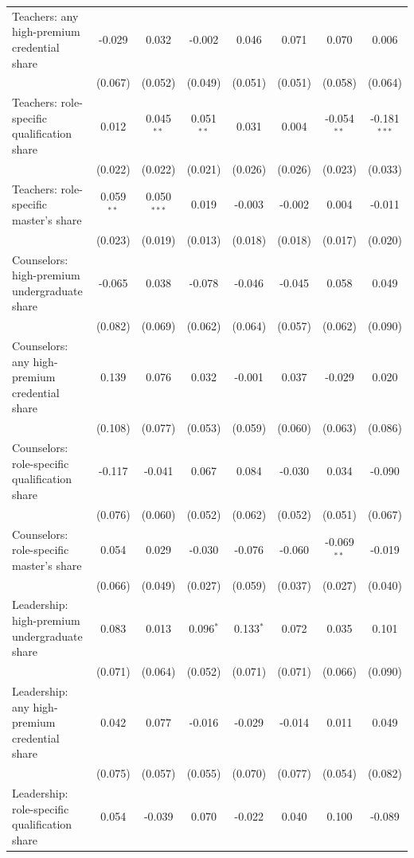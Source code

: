 \begin{table}[!htbp]
{\begin{tabular}{lccccccc}
\quad Teachers: any high-premium credential share & -0.029 & 0.032 & -0.002 & 0.046 & 0.071 & 0.070 & 0.006 \\
 & (0.067) & (0.052) & (0.049) & (0.051) & (0.051) & (0.058) & (0.064) \\
\quad Teachers: role-specific qualification share & 0.012 & 0.045$^{**}$ & 0.051$^{**}$ & 0.031 & 0.004 & -0.054$^{**}$ & -0.181$^{***}$ \\
 & (0.022) & (0.022) & (0.021) & (0.026) & (0.026) & (0.023) & (0.033) \\
\quad Teachers: role-specific master's share & 0.059$^{**}$ & 0.050$^{***}$ & 0.019 & -0.003 & -0.002 & 0.004 & -0.011 \\
 & (0.023) & (0.019) & (0.013) & (0.018) & (0.018) & (0.017) & (0.020) \\
\quad Counselors: high-premium undergraduate share & -0.065 & 0.038 & -0.078 & -0.046 & -0.045 & 0.058 & 0.049 \\
 & (0.082) & (0.069) & (0.062) & (0.064) & (0.057) & (0.062) & (0.090) \\
\quad Counselors: any high-premium credential share & 0.139 & 0.076 & 0.032 & -0.001 & 0.037 & -0.029 & 0.020 \\
 & (0.108) & (0.077) & (0.053) & (0.059) & (0.060) & (0.063) & (0.086) \\
\quad Counselors: role-specific qualification share & -0.117 & -0.041 & 0.067 & 0.084 & -0.030 & 0.034 & -0.090 \\
 & (0.076) & (0.060) & (0.052) & (0.062) & (0.052) & (0.051) & (0.067) \\
\quad Counselors: role-specific master's share & 0.054 & 0.029 & -0.030 & -0.076 & -0.060 & -0.069$^{**}$ & -0.019 \\
 & (0.066) & (0.049) & (0.027) & (0.059) & (0.037) & (0.027) & (0.040) \\
\quad Leadership: high-premium undergraduate share & 0.083 & 0.013 & 0.096$^{*}$ & 0.133$^{*}$ & 0.072 & 0.035 & 0.101 \\
 & (0.071) & (0.064) & (0.052) & (0.071) & (0.071) & (0.066) & (0.090) \\
\quad Leadership: any high-premium credential share & 0.042 & 0.077 & -0.016 & -0.029 & -0.014 & 0.011 & 0.049 \\
 & (0.075) & (0.057) & (0.055) & (0.070) & (0.077) & (0.054) & (0.082) \\
\quad Leadership: role-specific qualification share & 0.054 & -0.039 & 0.070 & -0.022 & 0.040 & 0.100 & -0.089 \\

\end{tabular}}
\end{table}
